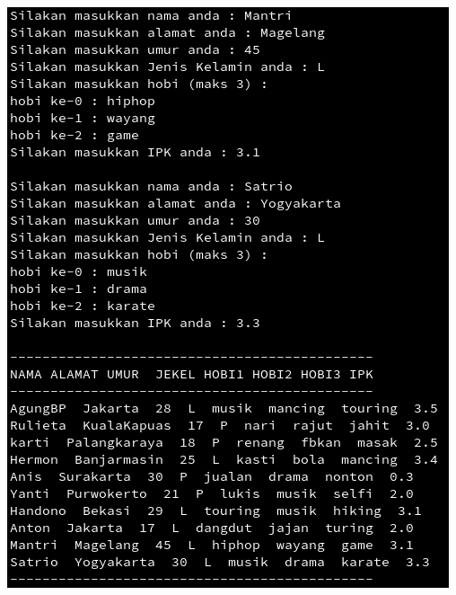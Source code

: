 \documentclass[a4paper,12pt]{article}
\begin{document}
\begin{center}
    \includegraphics[scale=.7]{out-prak2-3.png}

\end{center}
\end{document}
